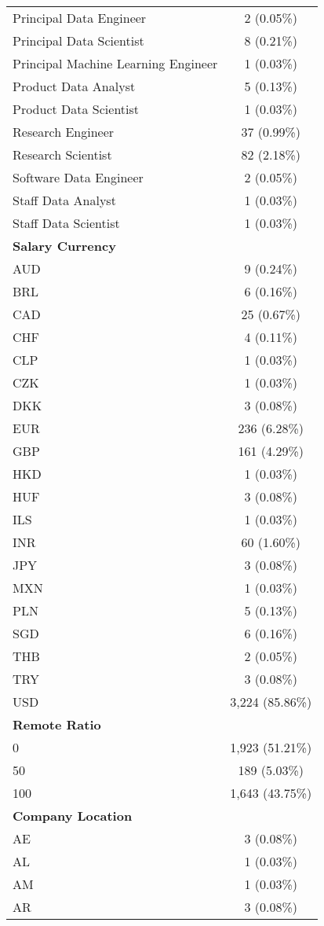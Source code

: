 \documentclass[
]{article}
\begin{document}
\begin{longtable}[]{@{}lc@{}}
Principal Data Engineer & 2 (0.05\%) \\
Principal Data Scientist & 8 (0.21\%) \\
Principal Machine Learning Engineer & 1 (0.03\%) \\
Product Data Analyst & 5 (0.13\%) \\
Product Data Scientist & 1 (0.03\%) \\
Research Engineer & 37 (0.99\%) \\
Research Scientist & 82 (2.18\%) \\
Software Data Engineer & 2 (0.05\%) \\
Staff Data Analyst & 1 (0.03\%) \\
Staff Data Scientist & 1 (0.03\%) \\
\textbf{Salary Currency} & \\
AUD & 9 (0.24\%) \\
BRL & 6 (0.16\%) \\
CAD & 25 (0.67\%) \\
CHF & 4 (0.11\%) \\
CLP & 1 (0.03\%) \\
CZK & 1 (0.03\%) \\
DKK & 3 (0.08\%) \\
EUR & 236 (6.28\%) \\
GBP & 161 (4.29\%) \\
HKD & 1 (0.03\%) \\
HUF & 3 (0.08\%) \\
ILS & 1 (0.03\%) \\
INR & 60 (1.60\%) \\
JPY & 3 (0.08\%) \\
MXN & 1 (0.03\%) \\
PLN & 5 (0.13\%) \\
SGD & 6 (0.16\%) \\
THB & 2 (0.05\%) \\
TRY & 3 (0.08\%) \\
USD & 3,224 (85.86\%) \\
\textbf{Remote Ratio} & \\
0 & 1,923 (51.21\%) \\
50 & 189 (5.03\%) \\
100 & 1,643 (43.75\%) \\
\textbf{Company Location} & \\
AE & 3 (0.08\%) \\
AL & 1 (0.03\%) \\
AM & 1 (0.03\%) \\
AR & 3 (0.08\%) \\

\end{longtable}
\end{document}
